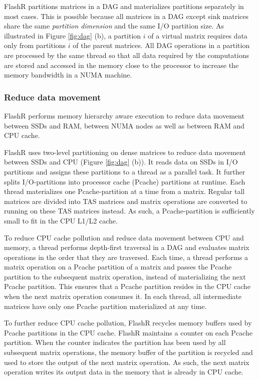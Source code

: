 FlashR partitions matrices in a DAG and materializes partitions separately in
most cases. This is possible because all matrices in a DAG except sink matrices
share the same \textit{partition dimension} and the same I/O partition size.
As illustrated in Figure \ref{fig:dag} (b), a partition $i$ of a virtual
matrix requires data only from partitions
$i$ of the parent matrices.  All DAG operations in a partition are processed by 
the same thread so that all data required by the computations are stored and
accessed in the memory close to the processor to increase the memory bandwidth
in a NUMA machine.

\subsubsection{Reduce data movement}
FlashR performs memory hierarchy aware execution to reduce data movement
between SSDs and RAM, between NUMA nodes as well as between RAM and CPU cache.

FlashR uses two-level partitioning on dense matrices to reduce data movement
between SSDs and CPU (Figure \ref{fig:dag} (b)). It reads data on SSDs in
I/O partitions and assigns these partitions to a thread as a parallel task.
It further splits I/O-partitions into processor cache (Pcache) partitions
at runtime.  Each thread materializes one Pcache-partition at a time from
a matrix. Regular tall matrices are divided into TAS matrices and matrix
operations are converted to running on these TAS matrices instead. As such,
a Pcache-partition is sufficiently small to fit in the CPU L1/L2 cache.

To reduce CPU cache pollution and reduce data movement between CPU and memory,
a thread performs depth-first traversal in a DAG and evaluates matrix operations
in the order that they are traversed. Each time, a thread performs a matrix
operation on a Pcache partition of a matrix and passes the Pcache partition to
the subsequent matrix operation, instead of materializing the next Pcache partition.
This ensures that a Pcache partition resides in the CPU cache when the next
matrix operation consumes it. In each thread, all intermediate matrices have
only one Pcache partition materialized at any time.

To further reduce CPU cache pollution, FlashR recycles memory buffers used
by Pcache partitions in the CPU cache. FlashR maintains a counter on each
Pcache partition. When the counter indicates the partition has been used
by all subsequent matrix operations, the memory buffer of the partition is
recycled and used to store the output of
the next matrix operation. As such, the next matrix operation writes
its output data in the memory that is already in CPU cache.
